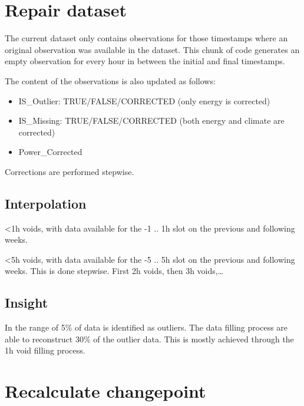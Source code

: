 \documentclass[
]{article}
\begin{document}
\hypertarget{repair-dataset}{%
\section{Repair dataset}\label{repair-dataset}}

The current dataset only contains observations for those timestamps
where an original observation was available in the dataset. This chunk
of code generates an empty observation for every hour in between the
initial and final timestamps.

The content of the observations is also updated as follows:

\begin{itemize}
\item
  IS\_Outlier: TRUE/FALSE/CORRECTED (only energy is corrected)
\item
  IS\_Missing: TRUE/FALSE/CORRECTED (both energy and climate are
  corrected)
\item
  Power\_Corrected
\end{itemize}

Corrections are performed stepwise.

\hypertarget{interpolation}{%
\subsection{Interpolation}\label{interpolation}}

\textless1h voids, with data available for the -1 .. 1h slot on the
previous and following weeks.

\textless5h voids, with data available for the -5 .. 5h slot on the
previous and following weeks. This is done stepwise. First 2h voids,
then 3h voids,\ldots{}

\hypertarget{insight-3}{%
\subsection{Insight}\label{insight-3}}

In the range of 5\% of data is identified as outliers. The data filling
process are able to reconstruct 30\% of the outlier data. This is mostly
achieved through the 1h void filling process.

\hypertarget{recalculate-changepoint}{%
\section{Recalculate changepoint}\label{recalculate-changepoint}}
\end{document}
